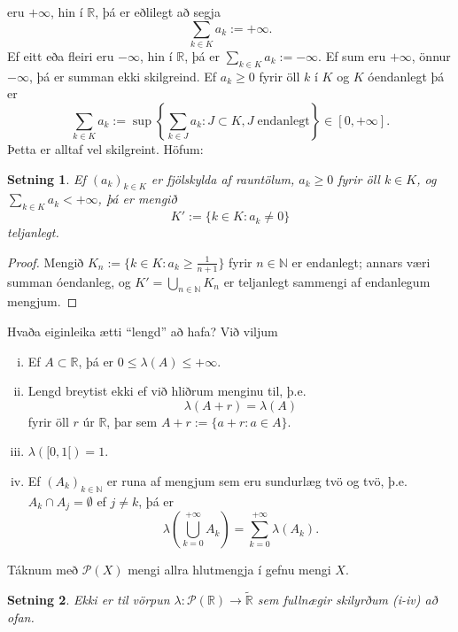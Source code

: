 \documentclass[a4paper,icelandic,11pt]{book}
\theoremstyle{plain}      \newtheorem{setn}{Setning}[chapter]
\theoremstyle{definition} \newtheorem{skilgr}[setn]{Skilgreining}
\theoremstyle{remark}     \newtheorem*{ath}{Athugasemd}
\newcommand{\R}{\mathbb R}
\newcommand{\N}{\mathbb N}
\begin{document}
eru $+\infty$, hin í $\R$, þá er eðlilegt að segja
\[
\sum_{k\in K}a_{k} := +\infty.
\]
Ef eitt eða fleiri eru $-\infty$, hin í $\R$, þá er $\sum_{k\in{K}}
a_{k}:=-\infty$. Ef sum eru $+\infty$, önnur $-\infty$, þá er summan
ekki skilgreind.  Ef $a_{k}\ge 0$ fyrir öll $k$ í $K$ og $K$
óendanlegt þá er
\[
\sum_{k\in K}a_{k}
:= \sup\left\{\sum_{k\in J}a_{k}:J\subset K,J\;\text{endanlegt} \right\}
\in[0,+\infty].
\]
Þetta er alltaf vel skilgreint. Höfum:
\begin{setn}
  Ef $(a_{k})_{k\in K}$ er fjölskylda af rauntölum, $a_{k}\ge 0$ fyrir
  öll $k\in K$, og $\sum_{k\in K}a_{k}<+\infty$, þá er mengið
  \[
  K':=\{k\in K:a_{k}\ne 0\}
  \]
  teljanlegt.
\end{setn}
\begin{proof}
  Mengið $K_{n}:=\{k\in K : a_{k}\ge\frac 1{n+1}\}$ fyrir $n\in\N$ er
  endanlegt; annars væri summan óendanleg, og
  $K'=\bigcup_{n\in\N}K_{n}$ er teljanlegt sammengi af endanlegum
  mengjum.
\end{proof}
Hvaða eiginleika ætti ``lengd'' að hafa? Við viljum
\begin{enumerate}[(i)]
\item Ef $A\subset\R$, þá er $0\le\lambda(A)\le+\infty$.
\item Lengd breytist ekki ef við hliðrum menginu til,
  þ.e.
  \[
  \lambda(A+r)=\lambda(A)
  \]
  fyrir öll $r$ úr $\R$, þar sem $A+r:=\{a+r:a\in A\}$.
\item $\lambda([0,1[)=1$.
\item Ef $(A_{k})_{k\in\N}$ er runa af mengjum sem eru
  sundurlæg tvö og tvö, þ.e. $A_{k}\cap A_{j}=\emptyset$ ef $j\ne k$,
  þá er
  \[
  \lambda(\bigcup_{k=0}^{+\infty}A_{k})=\sum_{k=0}^{+\infty}\lambda(A_{k}).
  \]
\end{enumerate}
Táknum með $\mathcal P(X)$ mengi allra hlutmengja í gefnu mengi $X$.
\begin{setn}
  Ekki er til vörpun $\lambda: \mathcal{P}(\R)\to\tilde{\R}$ sem
  fullnægir skilyrðum (i-iv) að ofan.
\end{setn}
\end{document}
